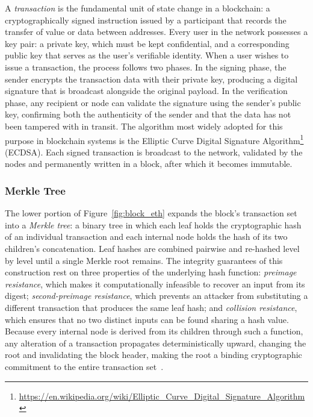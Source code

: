 A \emph{transaction} is the fundamental unit of state change in a blockchain: a cryptographically signed instruction issued by a participant that records the transfer of value or data between addresses. Every user in the network possesses a key pair: a private key, which must be kept confidential, and a corresponding public key that serves as the user's verifiable identity. When a user wishes to issue a transaction, the process follows two phases. In the signing phase, the sender encrypts the transaction data with their private key, producing a digital signature that is broadcast alongside the original payload. In the verification phase, any recipient or node can validate the signature using the sender's public key, confirming both the authenticity of the sender and that the data has not been tampered with in transit. The algorithm most widely adopted for this purpose in blockchain systems is the Elliptic Curve Digital Signature Algorithm\footnote{\url{https://en.wikipedia.org/wiki/Elliptic_Curve_Digital_Signature_Algorithm}} (ECDSA). Each signed transaction is broadcast to the network, validated by the nodes and permanently written in a block, after which it becomes immutable.

\subsubsection*{Merkle Tree}
The lower portion of Figure~\ref{fig:block_eth} expands the block's transaction set into a \emph{Merkle tree}: a binary tree in which each leaf holds the cryptographic hash of an individual transaction and each internal node holds the hash of its two children's concatenation. Leaf hashes are combined pairwise and re-hashed level by level until a single Merkle root remains. The integrity guarantees of this construction rest on three properties of the underlying hash function: \emph{preimage resistance}, which makes it computationally infeasible to recover an input from its digest; \emph{second-preimage resistance}, which prevents an attacker from substituting a different transaction that produces the same leaf hash; and \emph{collision resistance}, which ensures that no two distinct inputs can be found sharing a hash value. Because every internal node is derived from its children through such a function, any alteration of a transaction propagates deterministically upward, changing the root and invalidating the block header, making the root a binding cryptographic commitment to the entire transaction set~\cite{merkle1987, nakamoto2008}.

